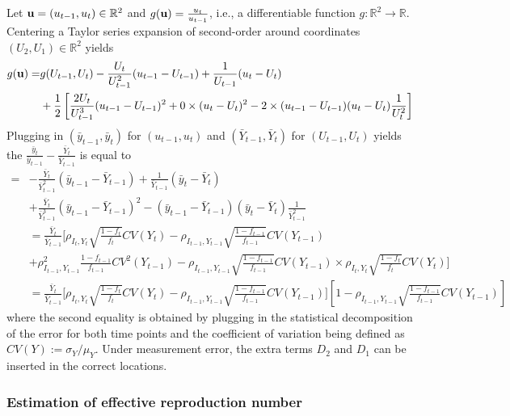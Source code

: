 \documentclass[12pt]{article}
\begin{document}
Let ${\bf u} = (u_{t-1},u_t) \in \mathbb{R}^2$ and $g({\bf u}) = \frac{u_t}{u_{t-1}}$, i.e., a differentiable function $g:\mathbb{R}^2 \to \mathbb{R}$. Centering a Taylor series expansion of second-order around coordinates $(U_2, U_1) \in \mathbb{R}^2$ yields
$$
\begin{aligned}
g({\bf u}) =& g(U_{t-1}, U_t) - \frac{U_t}{U_{t-1}^2} (u_{t-1} - U_{t-1}) + \frac{1}{U_{t-1}} (u_t - U_t) \\
&+ \frac{1}{2} \left[ \frac{2 U_t}{U_{t-1}^3} (u_{t-1} - U_{t-1})^2 + 0 \times (u_t - U_t)^2 - 2 \times (u_{t-1} - U_{t-1}) (u_t - U_t) \frac{1}{U_t^2} \right]
\end{aligned}
$$
Plugging in $(\bar y_{t-1}, \bar y_t)$ for $(u_{t-1}, u_t)$ and $(\bar Y_{t-1}, \bar Y_t)$ for $(U_{t-1}, U_t)$ yields the $\frac{\bar y_t}{\bar y_{t-1}} - \frac{\bar Y_t}{\bar Y_{t-1}} $ is equal to
$$
\begin{aligned}
=&
- \frac{\bar Y_t}{\bar Y_{t-1}^2} (\bar y_{t-1} - \bar Y_{t-1}) + \frac{1}{\bar Y_{t-1}} (\bar y_t - \bar Y_t) \\
&+ \frac{\bar Y_t}{\bar Y_{t-1}^3} (\bar y_{t-1} - \bar Y_{t-1})^2 -  (\bar y_{t-1} - \bar Y_{t-1}) (\bar y_t - \bar Y_t) \frac{1}{\bar Y_{t-1}^2} \\
&= \frac{\bar Y_t}{\bar Y_{t-1}} \bigg[  \rho_{I_t,Y_t} \sqrt{\frac{1-f_t}{f_t}} CV (Y_t)  -\rho_{I_{t-1},Y_{t-1}} \sqrt{\frac{1-f_{t-1}}{f_{t-1}}} CV (Y_{t-1}) \\
&+ \rho^2_{I_{t-1},Y_{t-1}} \frac{1-f_{t-1}}{f_{t-1}} CV^2 (Y_{t-1}) -  \rho_{I_{t-1},Y_{t-1}} \sqrt{\frac{1-f_{t-1}}{f_{t-1}}} CV (Y_{t-1}) \times
\rho_{I_t,Y_t} \sqrt{\frac{1-f_t}{f_t}} CV (Y_t)   \bigg] \\
&= \frac{\bar Y_t}{\bar Y_{t-1}} \bigg[ \rho_{I_t,Y_t} \sqrt{\frac{1-f_t}{f_t}} CV (Y_t)  -\rho_{I_{t-1},Y_{t-1}} \sqrt{\frac{1-f_{t-1}}{f_{t-1}}} CV (Y_{t-1}) \bigg] \left[ 1 - \rho_{I_{t-1},Y_{t-1}} \sqrt{\frac{1-f_{t-1}}{f_{t-1}}} CV (Y_{t-1}) \right]
\end{aligned}
$$
where the second equality is obtained by plugging in the statistical decomposition of the error for both time points and the coefficient of variation being defined as $CV(Y) := \sigma_Y/\mu_Y$.  Under measurement error, the extra terms $D_{2}$ and $D_1$ can be inserted in the correct locations.

\subsubsection*{Estimation of effective reproduction number}
\end{document}
